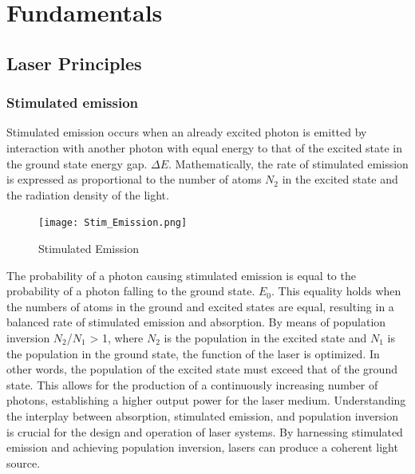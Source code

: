\section{Fundamentals}
\label{sec:fundamentals}

\subsection{Laser Principles}
    
    \subsubsection{Stimulated emission}
    Stimulated emission occurs when an already excited photon is emitted by interaction with another photon with equal energy to that of the excited state in the ground state energy gap. $\Delta E$.
    Mathematically, the rate of stimulated emission is expressed as proportional to the number of atoms $N_2$ in the excited state and the radiation density of the light.
   
    
    \begin{figure}
        \centering
        \texttt{[image: Stim\_Emission.png]}
        
        \caption[width = 0.1\textwidth]{ Stimulated Emission  \cite{Laser_cav} }
        \label{fig:energy_diagram}
    \end{figure}
    \noindent The probability of a photon causing stimulated emission is equal to the probability of a photon falling to the ground state. $E_0$.
    This equality holds when the numbers of atoms in the ground and excited states are equal, resulting in a balanced rate of stimulated emission and absorption.
    By means of population inversion $N_2$/$N_1$ > 1, where $N_2$ is the population in the excited state and $N_1$ is the population in the ground state, the function of the laser is optimized.
    In other words, the population of the excited state must exceed that of the ground state.
    This allows for the production of a continuously increasing number of photons, establishing a higher output power for the laser medium.
    Understanding the interplay between absorption, stimulated emission, and population inversion is crucial for the design and operation of laser systems.
    By harnessing stimulated emission and achieving population inversion, lasers can produce a coherent light source. \cite{Laser_cav}

